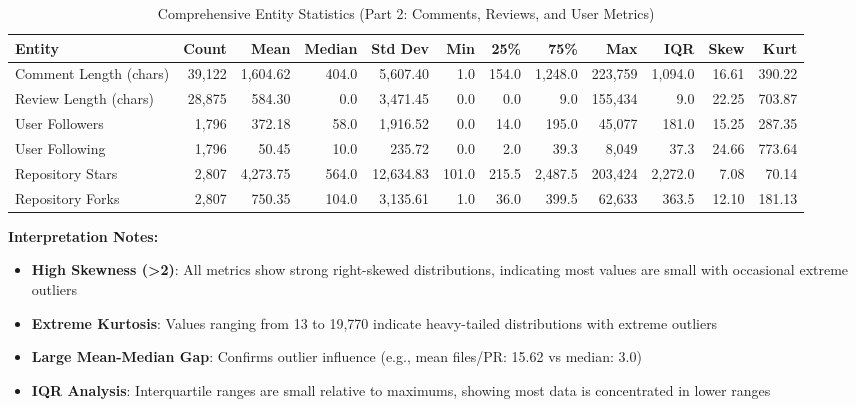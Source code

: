 \documentclass[11pt]{article}
\begin{document}
\begin{table}[H]
\centering
\caption{Comprehensive Entity Statistics (Part 2: Comments, Reviews, and User Metrics)}
\tiny
\begin{tabular}{@{}lrrrrrrrrrrr@{}}
\toprule
\textbf{Entity} & \textbf{Count} & \textbf{Mean} & \textbf{Median} & \textbf{Std Dev} & \textbf{Min} & \textbf{25\%} & \textbf{75\%} & \textbf{Max} & \textbf{IQR} & \textbf{Skew} & \textbf{Kurt} \\
\midrule
Comment Length (chars) & 39,122 & 1,604.62 & 404.0 & 5,607.40 & 1.0 & 154.0 & 1,248.0 & 223,759 & 1,094.0 & 16.61 & 390.22 \\
Review Length (chars) & 28,875 & 584.30 & 0.0 & 3,471.45 & 0.0 & 0.0 & 9.0 & 155,434 & 9.0 & 22.25 & 703.87 \\
User Followers & 1,796 & 372.18 & 58.0 & 1,916.52 & 0.0 & 14.0 & 195.0 & 45,077 & 181.0 & 15.25 & 287.35 \\
User Following & 1,796 & 50.45 & 10.0 & 235.72 & 0.0 & 2.0 & 39.3 & 8,049 & 37.3 & 24.66 & 773.64 \\
Repository Stars & 2,807 & 4,273.75 & 564.0 & 12,634.83 & 101.0 & 215.5 & 2,487.5 & 203,424 & 2,272.0 & 7.08 & 70.14 \\
Repository Forks & 2,807 & 750.35 & 104.0 & 3,135.61 & 1.0 & 36.0 & 399.5 & 62,633 & 363.5 & 12.10 & 181.13 \\
\bottomrule
\end{tabular}
\end{table}

\textbf{Interpretation Notes:}
\begin{itemize}
    \item \textbf{High Skewness (>2)}: All metrics show strong right-skewed distributions, indicating most values are small with occasional extreme outliers
    \item \textbf{Extreme Kurtosis}: Values ranging from 13 to 19,770 indicate heavy-tailed distributions with extreme outliers
    \item \textbf{Large Mean-Median Gap}: Confirms outlier influence (e.g., mean files/PR: 15.62 vs median: 3.0)
    \item \textbf{IQR Analysis}: Interquartile ranges are small relative to maximums, showing most data is concentrated in lower ranges
\end{itemize}
\end{document}

